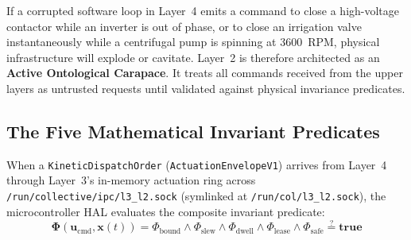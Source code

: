 If a corrupted software loop in Layer~4 emits a command to close a high-voltage contactor while an inverter is out of phase, or to close an irrigation valve instantaneously while a centrifugal pump is spinning at 3600~RPM, physical infrastructure will explode or cavitate. Layer~2 is therefore architected as an \textbf{Active Ontological Carapace}. It treats all commands received from the upper layers as untrusted requests until validated against physical invariance predicates.

\subsection{The Five Mathematical Invariant Predicates}

When a \texttt{KineticDispatchOrder} (\texttt{ActuationEnvelopeV1}) arrives from Layer~4 through Layer~3's in-memory actuation ring across \texttt{/run/collective/ipc/l3\_l2.sock} (symlinked at \texttt{/run/col/l3\_l2.sock}), the microcontroller HAL evaluates the composite invariant predicate:
\begin{equation}
\mathbf{\Phi}(\mathbf{u}_{\mathrm{cmd}}, \mathbf{x}(t)) = \Phi_{\mathrm{bound}} \land \Phi_{\mathrm{slew}} \land \Phi_{\mathrm{dwell}} \land \Phi_{\mathrm{lease}} \land \Phi_{\mathrm{safe}} \stackrel{?}{=} \mathbf{true}
\label{eq:l2_composite_invariant}
\end{equation}


